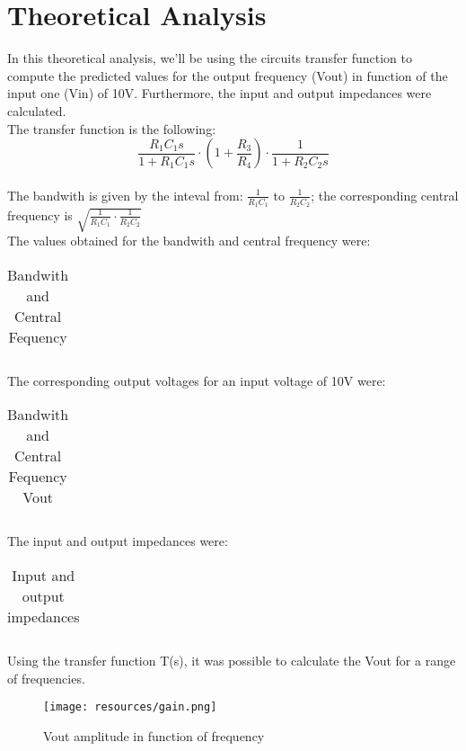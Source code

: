 \section{Theoretical Analysis}
\label{sec:analysis}

In this theoretical analysis, we'll be using the circuits transfer function to compute the predicted values for the output frequency (Vout) in function of the input one (Vin) of 10V. Furthermore, the input and output impedances were calculated.\\
The transfer function is the following: \[\frac{R_1C_1s}{1+R_1C_1s} \cdot (1+\frac{R_3}{R_4}) \cdot \frac{1}{1+R_2C_2s}\] \\
The bandwith is given by the inteval from: $\frac{1}{R_1C_1}$ to $\frac{1}{R_2C_2}$; the corresponding central frequency is $\sqrt{{\frac{1}{R_1C_1} \cdot \frac{1}{R_2C_2}}}$ \\
The values obtained for the bandwith and central frequency were:
\FloatBarrier
\begin{table}[h]
  \centering
  \begin{tabular}{|c|c|}
    \hline    
    
    \hline
  \end{tabular}
  \caption{Bandwith and Central Fequency}
  \label{tab:Octave_cent}
\end{table}
\FloatBarrier

The corresponding output voltages for an input voltage of 10V were:
\FloatBarrier
\begin{table}[h]
  \centering
  \begin{tabular}{|c|c|}
    \hline    
    
    \hline
  \end{tabular}
  \caption{Bandwith and Central Fequency Vout}
  \label{tab:Octave_cent}
\end{table}
\FloatBarrier

The input and output impedances were:
\FloatBarrier
\begin{table}[h]
  \centering
  \begin{tabular}{|c|c|c|}
    \hline    
    
    \hline
  \end{tabular}
  \caption{Input and output impedances}
  \label{tab:Octave_cent}
\end{table}
\FloatBarrier

Using the transfer function T(s), it was possible to calculate the Vout for a range of frequencies.

\begin{figure} [!htb] 
  \texttt{[image: resources/gain.png]}
  \caption{Vout amplitude in function of frequency} 
  \label{fig:theoplots}
  \endminipage\hfill
\end{figure}

